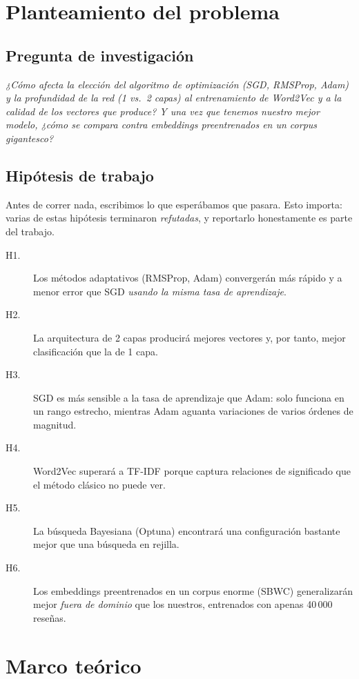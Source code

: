 \documentclass[11pt]{article}
\begin{document}
\section{Planteamiento del problema}

\subsection{Pregunta de investigación}
\emph{¿Cómo afecta la elección del algoritmo de optimización (SGD, RMSProp, Adam) y la
profundidad de la red (1 vs.\ 2 capas) al entrenamiento de Word2Vec y a la calidad de los
vectores que produce? Y una vez que tenemos nuestro mejor modelo, ¿cómo se compara contra
embeddings preentrenados en un corpus gigantesco?}

\subsection{Hipótesis de trabajo}
Antes de correr nada, escribimos lo que esperábamos que pasara. Esto importa: varias de estas
hipótesis terminaron \emph{refutadas}, y reportarlo honestamente es parte del trabajo.
\begin{description}
  \item[H1.] Los métodos adaptativos (RMSProp, Adam) convergerán más rápido y a menor error
  que SGD \emph{usando la misma tasa de aprendizaje}.
  \item[H2.] La arquitectura de 2 capas producirá mejores vectores y, por tanto, mejor
  clasificación que la de 1 capa.
  \item[H3.] SGD es más sensible a la tasa de aprendizaje que Adam: solo funciona en un rango
  estrecho, mientras Adam aguanta variaciones de varios órdenes de magnitud.
  \item[H4.] Word2Vec superará a TF-IDF porque captura relaciones de significado que el
  método clásico no puede ver.
  \item[H5.] La búsqueda Bayesiana (Optuna) encontrará una configuración bastante mejor que
  una búsqueda en rejilla.
  \item[H6.] Los embeddings preentrenados en un corpus enorme (SBWC) generalizarán mejor
  \emph{fuera de dominio} que los nuestros, entrenados con apenas 40\,000 reseñas.
\end{description}

\section{Marco teórico}\label{sec:teoria}
\end{document}
